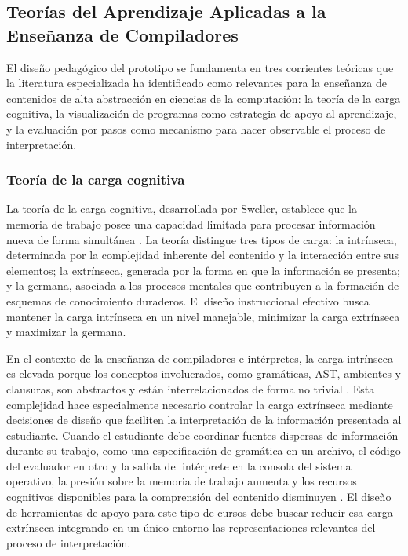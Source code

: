 \subsection{Teorías del Aprendizaje Aplicadas a la Enseñanza de Compiladores}

El diseño pedagógico del prototipo se fundamenta en tres corrientes teóricas que la literatura especializada ha identificado como relevantes para la enseñanza de contenidos de alta abstracción en ciencias de la computación: la teoría de la carga cognitiva, la visualización de programas como estrategia de apoyo al aprendizaje, y la evaluación por pasos como mecanismo para hacer observable el proceso de interpretación.

\subsubsection{Teoría de la carga cognitiva}

La teoría de la carga cognitiva, desarrollada por Sweller, establece que la memoria de trabajo posee una capacidad limitada para procesar información nueva de forma simultánea \cite{sweller2024cognitive}. La teoría distingue tres tipos de carga: la intrínseca, determinada por la complejidad inherente del contenido y la interacción entre sus elementos; la extrínseca, generada por la forma en que la información se presenta; y la germana, asociada a los procesos mentales que contribuyen a la formación de esquemas de conocimiento duraderos. El diseño instruccional efectivo busca mantener la carga intrínseca en un nivel manejable, minimizar la carga extrínseca y maximizar la germana.

En el contexto de la enseñanza de compiladores e intérpretes, la carga intrínseca es elevada porque los conceptos involucrados, como gramáticas, AST, ambientes y clausuras, son abstractos y están interrelacionados de forma no trivial \cite{zagami2023}. Esta complejidad hace especialmente necesario controlar la carga extrínseca mediante decisiones de diseño que faciliten la interpretación de la información presentada al estudiante. Cuando el estudiante debe coordinar fuentes dispersas de información durante su trabajo, como una especificación de gramática en un archivo, el código del evaluador en otro y la salida del intérprete en la consola del sistema operativo, la presión sobre la memoria de trabajo aumenta y los recursos cognitivos disponibles para la comprensión del contenido disminuyen \cite{sweller2024cognitive}. El diseño de herramientas de apoyo para este tipo de cursos debe buscar reducir esa carga extrínseca integrando en un único entorno las representaciones relevantes del proceso de interpretación.

